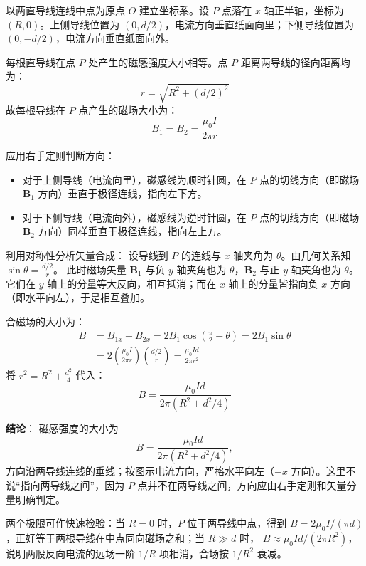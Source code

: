 \begin{solution}
以两直导线连线中点为原点 $O$ 建立坐标系。设 $P$ 点落在 $x$ 轴正半轴，坐标为 $(R, 0)$。上侧导线位置为 $(0, d/2)$，电流方向垂直纸面向里；下侧导线位置为 $(0, -d/2)$，电流方向垂直纸面向外。

每根直导线在点 $P$ 处产生的磁感强度大小相等。点 $P$ 距离两导线的径向距离均为：
$$ r = \sqrt{R^2 + (d/2)^2} $$
故每根导线在 $P$ 点产生的磁场大小为：
$$ B_1 = B_2 = \frac{\mu_0 I}{2\pi r} $$

应用右手定则判断方向：
\begin{itemize}
    \item 对于上侧导线（电流向里），磁感线为顺时针圆，在 $P$ 点的切线方向（即磁场 $\boldsymbol{B}_1$ 方向）垂直于极径连线，指向左下方。
    \item 对于下侧导线（电流向外），磁感线为逆时针圆，在 $P$ 点的切线方向（即磁场 $\boldsymbol{B}_2$ 方向）同样垂直于极径连线，指向左上方。
\end{itemize}

利用对称性分析矢量合成：
设导线到 $P$ 的连线与 $x$ 轴夹角为 $\theta$。由几何关系知 $\sin\theta = \frac{d/2}{r}$。
此时磁场矢量 $\boldsymbol{B}_1$ 与负 $y$ 轴夹角也为 $\theta$，$\boldsymbol{B}_2$ 与正 $y$ 轴夹角也为 $\theta$。它们在 $y$ 轴上的分量等大反向，相互抵消；而在 $x$ 轴上的分量皆指向负 $x$ 方向（即水平向左），于是相互叠加。

合磁场的大小为：
\begin{align*}
    B &= B_{1x} + B_{2x} = 2 B_1 \cos\left( \frac{\pi}{2} - \theta \right) = 2 B_1 \sin\theta \\
      &= 2 \left( \frac{\mu_0 I}{2\pi r} \right) \left( \frac{d/2}{r} \right) = \frac{\mu_0 I d}{2\pi r^2}
\end{align*}
将 $r^2 = R^2 + \frac{d^2}{4}$ 代入：
$$ B = \frac{\mu_0 I d}{2\pi \left( R^2 + d^2/4 \right)} $$

\textbf{结论}：
磁感强度的大小为
\[
B = \frac{\mu_0 I d}{2\pi \left( R^2 + d^2/4 \right)},
\]
方向沿两导线连线的垂线；按图示电流方向，严格水平向左（$-x$ 方向）。这里不说“指向两导线之间”，因为 $P$ 点并不在两导线之间，方向应由右手定则和矢量分量明确判定。

两个极限可作快速检验：当 $R=0$ 时，$P$ 位于两导线中点，得到 $B=2\mu_0I/(\pi d)$，正好等于两根导线在中点同向磁场之和；当 $R\gg d$ 时，
$B\approx\mu_0Id/(2\pi R^2)$，说明两股反向电流的远场一阶 $1/R$ 项相消，合场按 $1/R^2$ 衰减。
\end{solution}

